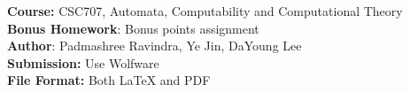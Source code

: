 \documentclass{article}
\begin{document}
\begin{flushleft}
\textbf{Course:} CSC707, Automata, Computability and Computational Theory\\
\textbf{Bonus Homework}: Bonus points assignment\\
\textbf{Author}: Padmashree Ravindra, Ye Jin, DaYoung Lee\\
\textbf{Submission:} Use Wolfware\\
\textbf{File Format:} Both LaTeX and PDF\\
\end{flushleft}

\begin{center}
\\
\end{center}

\noindent{\hrulefill}
\bigskip
\end{document}
